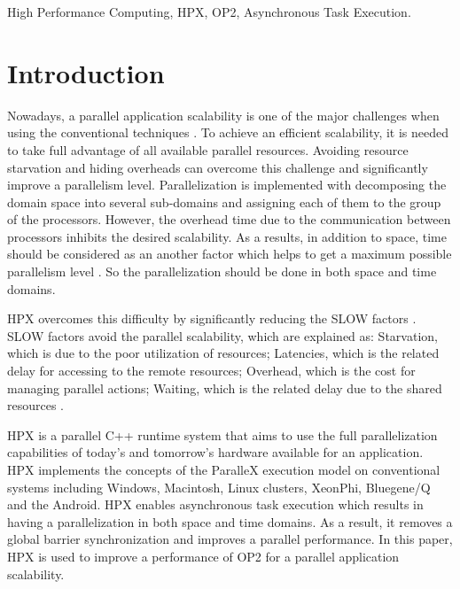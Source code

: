 \documentclass[conference]{IEEEtran}
\begin{document}
\begin{IEEEkeywords}
High Performance Computing, HPX, OP2, Asynchronous Task Execution.

\end{IEEEkeywords}

\section{Introduction}
Nowadays, a parallel application scalability is one of the major challenges when using the conventional techniques \cite{r11,r12}. To achieve an efficient scalability, it is needed to take full advantage of all available parallel resources. Avoiding resource starvation and hiding overheads can overcome this challenge and significantly improve a parallelism level. Parallelization is implemented with decomposing the domain space into several sub-domains and assigning each of them to the group of the processors. However, the overhead time due to the communication between processors inhibits the desired scalability. As a results, in addition to space, time should be considered as an another factor which helps to get a maximum possible parallelism level\cite{r7} \cite{r14}. So the parallelization should be done in both space and time domains. 

HPX \cite{r19} overcomes this difficulty by significantly reducing the SLOW factors \cite{r6}. SLOW factors avoid the parallel scalability, which are explained as: Starvation, which is due to the poor utilization of resources; Latencies, which is the related delay for accessing to the remote resources; Overhead, which is the cost for managing parallel actions; Waiting, which is the related delay due to the shared resources \cite{r7}. 

HPX is a parallel C++ runtime system that aims to use the full parallelization capabilities of today's and tomorrow's hardware available for an application. HPX implements the concepts of the ParalleX execution model \cite{o9,o10,o11} on conventional systems including Windows, Macintosh, Linux clusters, XeonPhi, Bluegene/Q and the Android. HPX enables asynchronous task execution which results in having a parallelization in both space and time domains. As a result, it removes a global barrier synchronization and improves a parallel performance. In this paper, HPX is used to improve a performance of OP2 for a parallel application scalability.
\end{document}
